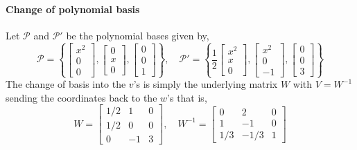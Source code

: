 \documentclass[10pt]{scrartcl}
\begin{document}
\paragraph{Change of polynomial basis} Let $\mathcal{P}$ and $\mathcal{P}'$ be the polynomial bases given by,
\[\mathcal{P} = \left\{\begin{bmatrix}x^2\\0\\0\end{bmatrix},\begin{bmatrix}0\\x\\0\end{bmatrix},\begin{bmatrix}0\\0\\1\end{bmatrix}\right\},\quad
\mathcal{P}' = \left\{\frac{1}{2}\begin{bmatrix} x^2\\ x\\0\end{bmatrix},\begin{bmatrix}x^2\\0\\-1\end{bmatrix},\begin{bmatrix}0\\0\\3\end{bmatrix}\right\}\] The change of basis into the $v$'s is simply the underlying matrix $W$ with $V = W^{-1}$ sending the coordinates back to the $w$'s that is,
\[W = \begin{bmatrix}1/2& 1& 0\\ 1/2& 0& 0\\ 0& -1& 3\end{bmatrix},\quad W^{-1}=\begin{bmatrix}0& 2& 0\\ 1& -1& 0\\ 1/3& -1/3& 1\end{bmatrix} \]
\end{document}
